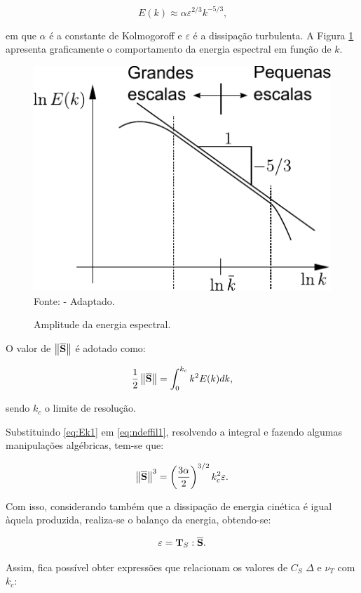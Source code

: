 \begin{equation}
    E(k)\approx\alpha\varepsilon^{2/3}k^{-5/3}\text{,}\label{eq:Ek1}
\end{equation}

\noindent em que $\alpha$ é a constante de Kolmogoroff e $\varepsilon$ é a dissipação turbulenta. A Figura \ref{fig:EnergiaEspectral} apresenta graficamente o comportamento da energia espectral em função de $k$.

\begin{figure}[h!]
    \centering
    \caption{Amplitude da energia espectral.}
    \includegraphics[width=0.4\linewidth]{Figuras/EnergiaEspectral.pdf}
    \\Fonte: \cite{hughes2000large} - Adaptado.
    \label{fig:EnergiaEspectral}
\end{figure}

O valor de $\left\lVert{\overline{\mathbf{S}}}\right\lVert$ é adotado como:

\begin{equation}
    \frac{1}{2}\left\lVert{\overline{\mathbf{S}}}\right\lVert=\int_0^{k_c}{k^2E(k)dk}\text{,}\label{eq:ndeffil1}
\end{equation}

\noindent sendo $k_c$ o limite de resolução.

Substituindo \eqref{eq:Ek1} em \eqref{eq:ndeffil1}, resolvendo a integral e fazendo algumas manipulações algébricas, tem-se que:

\begin{equation}
    \left\lVert{\overline{\mathbf{S}}}\right\lVert^3=\left({\frac{3\alpha}{2}}\right)^{3/2}k_c^2\varepsilon\text{.}
\end{equation}

Com isso, considerando também que a dissipação de energia cinética é igual àquela produzida, realiza-se o balanço da energia, obtendo-se:

\begin{equation}
    \varepsilon=\mathbf{T}_S:\overline{\mathbf{S}}\text{.}
\end{equation}

\noindent Assim, fica possível obter expressões que relacionam os valores de $C_S$ $\Delta$ e $\nu_T$ com $k_c$:

